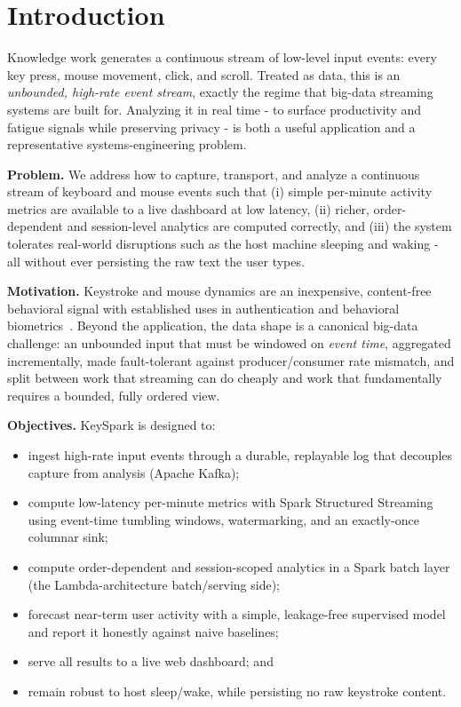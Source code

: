 \documentclass[conference]{IEEEtran}
\begin{document}
\section{Introduction}
\label{sec:intro}

Knowledge work generates a continuous stream of low-level input events:
every key press, mouse movement, click, and scroll. Treated as data, this
is an \emph{unbounded, high-rate event stream}, exactly the regime that
big-data streaming systems are built for. Analyzing it in real time - to
surface productivity and fatigue signals while preserving privacy - is
both a useful application and a representative systems-engineering problem.

\textbf{Problem.} We address how to capture, transport, and analyze a
continuous stream of keyboard and mouse events such that (i) simple
per-minute activity metrics are available to a live dashboard at low
latency, (ii) richer, order-dependent and session-level analytics are
computed correctly, and (iii) the system tolerates real-world
disruptions such as the host machine sleeping and waking - all without
ever persisting the raw text the user types.

\textbf{Motivation.} Keystroke and mouse dynamics are an inexpensive,
content-free behavioral signal with established uses in authentication
and behavioral biometrics~\cite{monrose2000keystroke}. Beyond the
application, the data shape is a canonical big-data challenge: an
unbounded input that must be windowed on \emph{event time}, aggregated
incrementally, made fault-tolerant against producer/consumer rate
mismatch, and split between work that streaming can do cheaply and work
that fundamentally requires a bounded, fully ordered view.

\textbf{Objectives.} KeySpark is designed to:
\begin{itemize}
  \item ingest high-rate input events through a durable, replayable log
        that decouples capture from analysis (Apache Kafka);
  \item compute low-latency per-minute metrics with Spark Structured
        Streaming using event-time tumbling windows, watermarking, and
        an exactly-once columnar sink;
  \item compute order-dependent and session-scoped analytics in a Spark
        batch layer (the Lambda-architecture batch/serving side);
  \item forecast near-term user activity with a simple, leakage-free
        supervised model and report it honestly against naive baselines;
  \item serve all results to a live web dashboard; and
  \item remain robust to host sleep/wake, while persisting no raw
        keystroke content.
\end{itemize}
\end{document}
